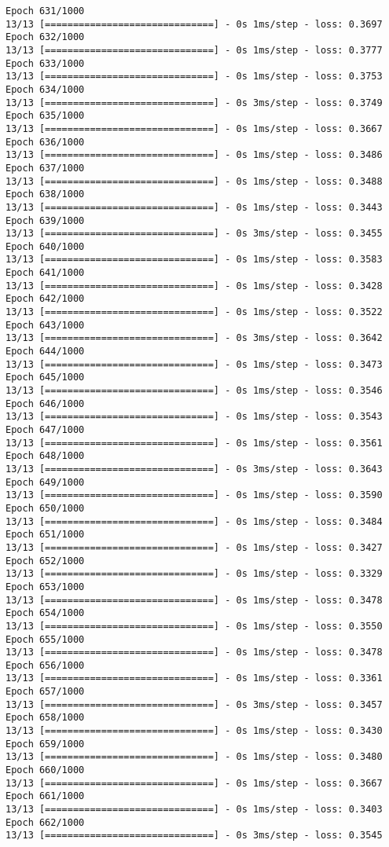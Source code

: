 \documentclass[11pt]{article}
\begin{document}
\begin{Verbatim}[commandchars=\\\{\}]
Epoch 631/1000
13/13 [==============================] - 0s 1ms/step - loss: 0.3697
Epoch 632/1000
13/13 [==============================] - 0s 1ms/step - loss: 0.3777
Epoch 633/1000
13/13 [==============================] - 0s 1ms/step - loss: 0.3753
Epoch 634/1000
13/13 [==============================] - 0s 3ms/step - loss: 0.3749
Epoch 635/1000
13/13 [==============================] - 0s 1ms/step - loss: 0.3667
Epoch 636/1000
13/13 [==============================] - 0s 1ms/step - loss: 0.3486
Epoch 637/1000
13/13 [==============================] - 0s 1ms/step - loss: 0.3488
Epoch 638/1000
13/13 [==============================] - 0s 1ms/step - loss: 0.3443
Epoch 639/1000
13/13 [==============================] - 0s 3ms/step - loss: 0.3455
Epoch 640/1000
13/13 [==============================] - 0s 1ms/step - loss: 0.3583
Epoch 641/1000
13/13 [==============================] - 0s 1ms/step - loss: 0.3428
Epoch 642/1000
13/13 [==============================] - 0s 1ms/step - loss: 0.3522
Epoch 643/1000
13/13 [==============================] - 0s 3ms/step - loss: 0.3642
Epoch 644/1000
13/13 [==============================] - 0s 1ms/step - loss: 0.3473
Epoch 645/1000
13/13 [==============================] - 0s 1ms/step - loss: 0.3546
Epoch 646/1000
13/13 [==============================] - 0s 1ms/step - loss: 0.3543
Epoch 647/1000
13/13 [==============================] - 0s 1ms/step - loss: 0.3561
Epoch 648/1000
13/13 [==============================] - 0s 3ms/step - loss: 0.3643
Epoch 649/1000
13/13 [==============================] - 0s 1ms/step - loss: 0.3590
Epoch 650/1000
13/13 [==============================] - 0s 1ms/step - loss: 0.3484
Epoch 651/1000
13/13 [==============================] - 0s 1ms/step - loss: 0.3427
Epoch 652/1000
13/13 [==============================] - 0s 1ms/step - loss: 0.3329
Epoch 653/1000
13/13 [==============================] - 0s 1ms/step - loss: 0.3478
Epoch 654/1000
13/13 [==============================] - 0s 1ms/step - loss: 0.3550
Epoch 655/1000
13/13 [==============================] - 0s 1ms/step - loss: 0.3478
Epoch 656/1000
13/13 [==============================] - 0s 1ms/step - loss: 0.3361
Epoch 657/1000
13/13 [==============================] - 0s 3ms/step - loss: 0.3457
Epoch 658/1000
13/13 [==============================] - 0s 1ms/step - loss: 0.3430
Epoch 659/1000
13/13 [==============================] - 0s 1ms/step - loss: 0.3480
Epoch 660/1000
13/13 [==============================] - 0s 1ms/step - loss: 0.3667
Epoch 661/1000
13/13 [==============================] - 0s 1ms/step - loss: 0.3403
Epoch 662/1000
13/13 [==============================] - 0s 3ms/step - loss: 0.3545

\end{Verbatim}
\end{document}
